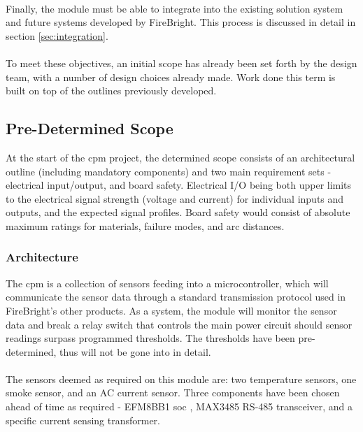 \documentclass[12pt]{article}
\begin{document}
  \paragraph{}
  Finally, the module must be able to integrate into the existing solution system and future systems developed by FireBright. This process is discussed in detail in section \ref{sec:integration}. 
  
  \paragraph{}
  To meet these objectives, an initial scope has already been set forth by the design team, with a number of design choices already made. Work done this term is built on top of the outlines previously developed.
	
	\subsection{Pre-Determined Scope\label{sec:pre-determined-scope}}
	At the start of the \acrfull{cpm} project, the determined scope consists of an architectural outline (including mandatory components) and two main requirement sets - electrical input/output, and board safety. Electrical I/O being both upper limits to the electrical signal strength (voltage and current) for individual inputs and outputs, and the expected signal profiles. Board safety would consist of absolute maximum ratings for materials, failure modes, and arc distances.
	
    \subsubsection{Architecture\label{sec:architecture}}
    The \acrshort{cpm} is a collection of sensors feeding into a microcontroller, which will communicate the sensor data through a standard transmission protocol used in FireBright's other products. As a system, the module will monitor the sensor data and break a relay switch that controls the main power circuit should sensor readings surpass programmed thresholds. The thresholds have been pre-determined, thus will not be gone into in detail. 

    \paragraph{}
    The sensors deemed as required on this module are: two temperature sensors, one smoke sensor, and an AC current sensor. Three components have been chosen ahead of time as required - EFM8BB1 \acrfull{soc} , MAX3485 RS-485 transceiver, and a specific current sensing transformer.
\end{document}
